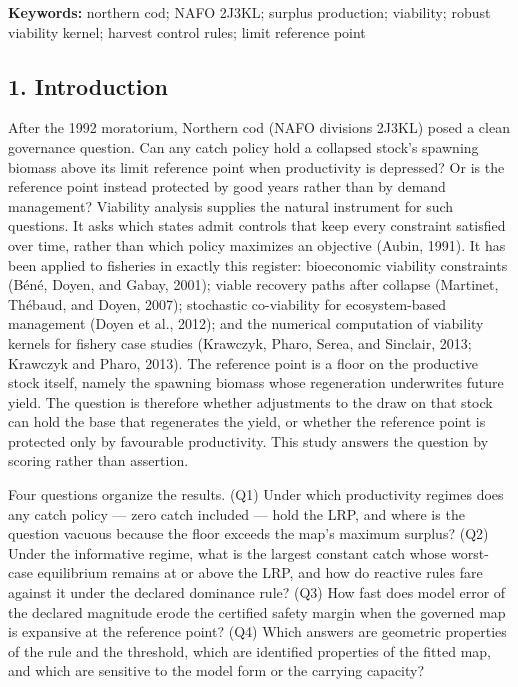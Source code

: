\documentclass[11pt]{article}
\begin{document}
\textbf{Keywords:} northern cod; NAFO 2J3KL; surplus production;
viability; robust viability kernel; harvest control rules; limit
reference point

\subsection{1. Introduction}\label{introduction}

After the 1992 moratorium, Northern cod (NAFO divisions 2J3KL) posed a
clean governance question. Can any catch policy hold a collapsed stock's
spawning biomass above its limit reference point when productivity is
depressed? Or is the reference point instead protected by good years
rather than by demand management? Viability analysis supplies the
natural instrument for such questions. It asks which states admit
controls that keep every constraint satisfied over time, rather than
which policy maximizes an objective (Aubin, 1991). It has been applied
to fisheries in exactly this register: bioeconomic viability constraints
(B\'en\'e, Doyen, and Gabay, 2001); viable recovery paths after collapse
(Martinet, Th\'ebaud, and Doyen, 2007); stochastic co-viability for
ecosystem-based management (Doyen et al., 2012); and the numerical
computation of viability kernels for fishery case studies (Krawczyk,
Pharo, Serea, and Sinclair, 2013; Krawczyk and Pharo, 2013). The
reference point is a floor on the productive stock itself, namely the
spawning biomass whose regeneration underwrites future yield. The
question is therefore whether adjustments to the draw on that stock can
hold the base that regenerates the yield, or whether the reference point
is protected only by favourable productivity. This study answers the
question by scoring rather than assertion.

Four questions organize the results. (Q1) Under which productivity
regimes does any catch policy --- zero catch included --- hold the LRP,
and where is the question vacuous because the floor exceeds the map's
maximum surplus? (Q2) Under the informative regime, what is the largest
constant catch whose worst-case equilibrium remains at or above the LRP,
and how do reactive rules fare against it under the declared dominance
rule? (Q3) How fast does model error of the declared magnitude erode the
certified safety margin when the governed map is expansive at the
reference point? (Q4) Which answers are geometric properties of the rule
and the threshold, which are identified properties of the fitted map,
and which are sensitive to the model form or the carrying capacity?
\end{document}
